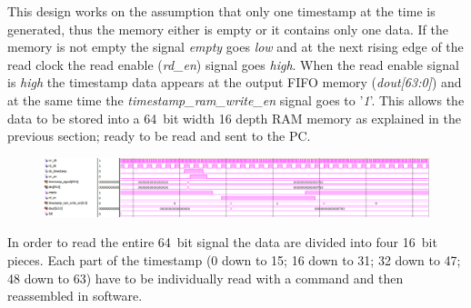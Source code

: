 This design works on the assumption that only one timestamp at the time is generated, thus the memory either is empty or it contains only one data.
If the memory is not empty the signal \textit{empty} goes \textit{low} and at the next rising edge of the read clock the read enable (\textit{rd\_en}) signal goes \textit{high}.
When the read enable signal is \textit{high} the timestamp data appears at the output FIFO memory (\textit{dout[63:0]}) and at the same time the \textit{timestamp\_ram\_write\_en} signal goes to '\textit{1}'.
This allows the data to be stored into a 64~bit width 16 depth RAM memory as explained in the previous section; ready to be read and sent to the PC.
\begin{figure}[H]
	\centering
	\includegraphics[width=1.0\linewidth]{IMG/ch4/TIMESTAMPsimulations/TIMESTAMPFIFO}
	\caption{}
	\label{fig:timestampfifo}
\end{figure}
\noindent In order to read the entire 64~bit signal the data are divided into four 16~bit pieces. Each part of the timestamp (0 down to 15; 16 down to 31; 32 down to 47; 48 down to 63) have to be individually read with a command and then reassembled in software. 

